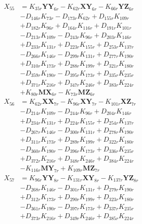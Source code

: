 \begin{multicols}{2}
\begin{align}
X_{55} &= K_{35r}\mathbf{YY}_{6r} - K_{62r}\mathbf{XY}_{6r} - K_{66r}\mathbf{YZ}_{6r}  \nonumber \\
&- D_{146r}K_{73r} - D_{173r}K_{62r} + D_{155r}K_{109r}  \nonumber \\
&+ D_{182r}K_{96r} + D_{164r}K_{116r} + D_{191r}K_{101r}  \nonumber \\
&- D_{213r}K_{109r} - D_{243r}K_{96r} + D_{203r}K_{146r}  \nonumber \\
&+ D_{233r}K_{131r} + D_{223r}K_{155r} + D_{253r}K_{137r}  \nonumber \\
&- D_{266r}K_{146r} - D_{299r}K_{131r} + D_{277r}K_{190r}  \nonumber \\
&+ D_{310r}K_{173r} + D_{288r}K_{199r} + D_{321r}K_{180r}  \nonumber \\
&- D_{359r}K_{190r} - D_{395r}K_{173r} + D_{335r}K_{235r}  \nonumber \\
&+ D_{371r}K_{216r} + D_{347r}K_{246r} + D_{383r}K_{224r}  \nonumber \\
&+ K_{80r}\mathbf{MX}_{6r} - K_{73r}\mathbf{MZ}_{6r} \nonumber \\
X_{56} &= K_{62r}\mathbf{XX}_{7r} - K_{96r}\mathbf{XY}_{7r} - K_{101r}\mathbf{XZ}_{7r}  \nonumber \\
&- D_{214r}K_{109r} - D_{244r}K_{96r} + D_{204r}K_{146r}  \nonumber \\
&+ D_{234r}K_{131r} + D_{224r}K_{155r} + D_{254r}K_{137r}  \nonumber \\
&- D_{267r}K_{146r} - D_{300r}K_{131r} + D_{278r}K_{190r}  \nonumber \\
&+ D_{311r}K_{173r} + D_{289r}K_{199r} + D_{322r}K_{180r}  \nonumber \\
&- D_{360r}K_{190r} - D_{396r}K_{173r} + D_{336r}K_{235r}  \nonumber \\
&+ D_{372r}K_{216r} + D_{348r}K_{246r} + D_{384r}K_{224r}  \nonumber \\
&- K_{116r}\mathbf{MY}_{7r} + K_{109r}\mathbf{MZ}_{7r} \nonumber \\
X_{57} &= K_{96r}\mathbf{YY}_{8r} - K_{131r}\mathbf{XY}_{8r} - K_{137r}\mathbf{YZ}_{8r}  \nonumber \\
&- D_{268r}K_{146r} - D_{301r}K_{131r} + D_{279r}K_{190r}  \nonumber \\
&+ D_{312r}K_{173r} + D_{290r}K_{199r} + D_{323r}K_{180r}  \nonumber \\
&- D_{361r}K_{190r} - D_{397r}K_{173r} + D_{337r}K_{235r}  \nonumber \\
&+ D_{373r}K_{216r} + D_{349r}K_{246r} + D_{385r}K_{224r}  \nonumber \\

\end{align}
\end{multicols}

